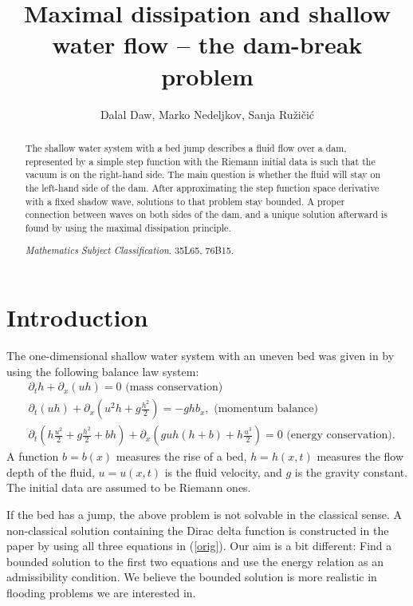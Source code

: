 \documentclass{article}
\title{Maximal dissipation and shallow water flow
-- the dam-break problem}
\author{Dalal Daw, Marko Nedeljkov, Sanja Ru\v zi\v ci\' c}
\date{}
\theoremstyle{plain}
\theoremstyle{definition}
\theoremstyle{remark}
\begin{document}
\maketitle

\begin{abstract}
The shallow water system with a bed jump describes a fluid flow
over a dam, represented by a simple step function with the 
Riemann initial data is such that the vacuum is on the right-hand side. The main question
is whether the fluid will stay on the left-hand side of the dam. After
approximating the step function space derivative with a fixed
shadow wave, solutions to that problem stay bounded.  
A proper connection between waves on both sides of the dam, 
and a unique solution afterward is found by using the maximal dissipation principle.

 {\it Mathematics Subject Classification}. 35L65, 76B15.

\end{abstract}

\section{Introduction}

The one-dimensional 
shallow water system with an uneven bed was given in \cite{KMT2017}
by using the following balance law system:
\begin{equation} \label{orig}
\begin{split}
& \partial_{t}h + \partial_{x}(uh) = 0 \text{ (mass conservation)} \\
& \partial_{t}(uh) + \partial_{x}\left( u^{2}h + g\frac{h^{2}}{2} \right)  = 
- ghb_{x}, \text{ (momentum balance)} \\
& \partial_{t}\left( h\frac{u^{2}}{2} + g\frac{h^{2}}{2} + bh \right) + 
\partial_{x}\left( guh(h + b) + h\frac{u^{3}}{2} \right)  = 0 
\text{ (energy conservation)}.
\end{split}
\end{equation}
A function $b=b(x)$ measures the rise of a bed, 
$h=h(x,t)$ measures the flow depth of the fluid, $u=u(x,t)$ is the
fluid velocity, and \(g\) is the gravity constant.
The initial data are assumed to be Riemann ones.

If the bed has a jump, the above problem is not 
solvable in the classical sense. A non-classical solution containing 
the Dirac delta function is constructed in the paper \cite{KMT2017}
by using all three equations in (\ref{orig}). Our aim is a bit different:
Find a bounded solution to the first two equations and use the energy 
relation as an admissibility condition. We believe the bounded 
solution is more realistic in flooding problems we are interested in.
\end{document}

